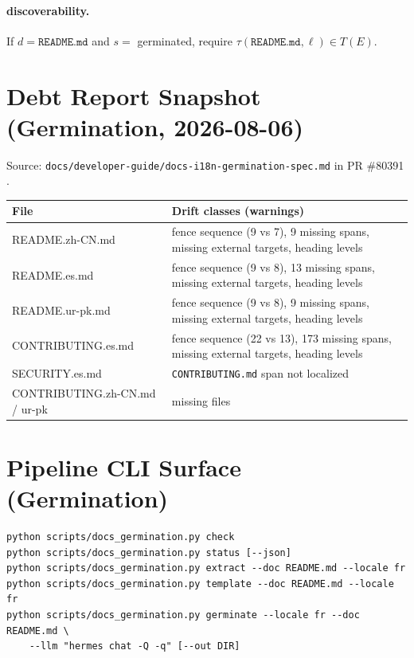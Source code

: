 \documentclass[11pt]{article}
\theoremstyle{definition}
\theoremstyle{plain}
\theoremstyle{remark}
\begin{document}
\paragraph{discoverability.}
If $d=\texttt{README.md}$ and $s=$ germinated, require
$\tau(\texttt{README.md},\ell) \in T(E)$.

\section{Debt Report Snapshot (Germination, 2026-08-06)}
\label{app:debt}

Source: \texttt{docs/developer-guide/docs-i18n-germination-spec.md} in PR
\#80391 \citep{hermesspec}.

\begin{center}
\begin{tabular}{@{}lp{}@{}}
\toprule
File & Drift classes (warnings) \\
\midrule
README.zh-CN.md & fence sequence (9 vs 7), 9 missing spans, missing external targets, heading levels \\
README.es.md & fence sequence (9 vs 8), 13 missing spans, missing external targets, heading levels \\
README.ur-pk.md & fence sequence (9 vs 8), 9 missing spans, missing external targets, heading levels \\
CONTRIBUTING.es.md & fence sequence (22 vs 13), 173 missing spans, missing external targets, heading levels \\
SECURITY.es.md & \texttt{CONTRIBUTING.md} span not localized \\
CONTRIBUTING.zh-CN.md / ur-pk & missing files \\
\bottomrule
\end{tabular}
\end{center}

\section{Pipeline CLI Surface (Germination)}
\label{app:cli}

\begin{verbatim}
python scripts/docs_germination.py check
python scripts/docs_germination.py status [--json]
python scripts/docs_germination.py extract --doc README.md --locale fr
python scripts/docs_germination.py template --doc README.md --locale fr
python scripts/docs_germination.py germinate --locale fr --doc README.md \
    --llm "hermes chat -Q -q" [--out DIR]
\end{verbatim}
\end{document}
